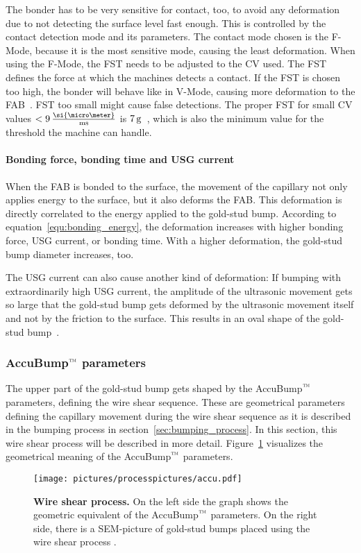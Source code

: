 The bonder has to be very sensitive for contact, too, to avoid any deformation due to not detecting the surface level fast enough. This is controlled by the contact detection mode and its parameters. The contact mode chosen is the F-Mode, because it is the most sensitive mode, causing the least deformation. When using the F-Mode, the \ac{FST} needs to be adjusted to the \acl{CV} used. The \ac{FST} defines the force at which the machines detects a contact. If the \ac{FST} is chosen too high, the bonder will behave like in V-Mode, causing more deformation to the \ac{FAB}~\cite{Kul08a}. \ac{FST} too small might cause false detections. The proper \ac{FST} for small \acl{CV} values $< 9\,\frac{\si{\micro \meter}}{\rm{ms}}$ is $7\,\rm{g}$~\cite{Kul08a}, which is also the minimum value for the threshold the machine can handle.

\paragraph*{Bonding force, bonding time and \ac{USG} current}
When the \ac{FAB} is bonded to the surface, the movement of the capillary not only applies energy to the surface, but it also deforms the \ac{FAB}. This deformation is directly correlated to the energy applied to the gold-stud bump. According to equation~\ref{equ:bonding_energy}, the deformation increases with higher bonding force, \ac{USG} current, or bonding time. With a higher deformation, the gold-stud bump diameter increases, too.

The \ac{USG} current can also cause another kind of deformation: If bumping with extraordinarily high \ac{USG} current, the amplitude of the ultrasonic movement gets so large that the gold-stud bump gets deformed by the ultrasonic movement itself and not by the friction to the surface. This results in an oval shape of the gold-stud bump~\cite{Rol14}.


\subsubsection{AccuBump$\rm{\symbTM}$ parameters}\label{sec:accu_parameters}
The upper part of the gold-stud bump gets shaped by the AccuBump$\rm{\symbTM}$ parameters, defining the wire shear sequence. These are geometrical parameters defining the capillary movement during the wire shear sequence as it is described in the bumping process in section~\ref{sec:bumping_process}. In this section, this wire shear process will be described in more detail. Figure~\ref{fig:accu_bump} visualizes the geometrical meaning of the AccuBump$\rm{\symbTM}$ parameters.
\begin{figure}
\begin{center}
\texttt{[image: pictures/processpictures/accu.pdf]}
\end{center}
\caption[Wire shear process]{\textbf{Wire shear process.} On the left side the graph shows the geometric equivalent of the AccuBump$\rm{\symbTM}$ parameters. On the right side, there is a \ac{SEM}-picture of gold-stud bumps placed using the wire shear process \cite{Kul05}.}\label{fig:accu_bump}
\end{figure}
